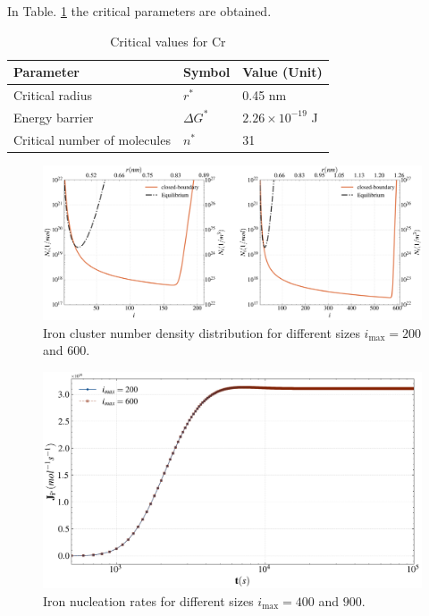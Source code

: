 In Table. \ref{tab:critical_cr} the critical parameters are obtained.
\begin{table}[h]
	\centering
	\begin{tabular}{|l|l|l|}
	\hline
	\textbf{Parameter} & \textbf{Symbol} & \textbf{Value (Unit)} \\ \hline
	Critical radius        & $r^*$             & 0.45 nm                 \\ \hline
	Energy barrier         & $\Delta G^*$             & $2.26 \times 10^{-19}$ J         \\ \hline
	Critical number of molecules       & $n^*$          & 31         \\ \hline
	\end{tabular}
	\caption{Critical values for Cr}
	\label{tab:critical_cr}
\end{table}


\begin{figure}[H]
    \centering
    \includegraphics[width=1.1\linewidth]{psd_cr.png}
    \caption{Iron cluster number density distribution for different sizes $i_{\text{max}} = 200$ and $600$.}
    \label{fig:psd_iron}
\end{figure}

\begin{figure}[H]
    \centering
    \includegraphics[width=1.1\linewidth]{postcritical_nucleation_rate_cr.png}
    \caption{Iron nucleation rates for different sizes $i_{\text{max}} = 400$ and $900$.}
    \label{fig:postcritical_nucleation_rate_fe}
\end{figure}

